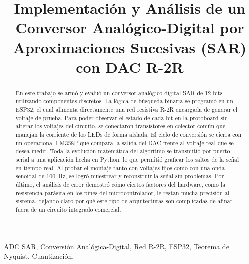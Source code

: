 \documentclass[conference]{IEEEtran}
\begin{document}
\title{Implementación y Análisis de un Conversor Analógico-Digital por Aproximaciones Sucesivas (SAR) con DAC R-2R}

\author{
}

\IEEEaftertitletext{\vspace{-1\baselineskip}}
\maketitle

\renewcommand\abstractname{Resumen}
\begin{abstract}
En este trabajo se armó y evaluó un conversor analógico-digital SAR de 12 bits utilizando componentes discretos. La lógica de búsqueda binaria se programó en un ESP32, el cual alimenta directamente una red resistiva R-2R encargada de generar el voltaje de prueba. Para poder observar el estado de cada bit en la protoboard sin alterar los voltajes del circuito, se conectaron transistores en colector común que manejan la corriente de los LEDs de forma aislada. El ciclo de conversión se cierra con un operacional LM358P que compara la salida del DAC frente al voltaje real que se desea medir. Toda la evolución matemática del algoritmo se transmitió por puerto serial a una aplicación hecha en Python, lo que permitió graficar los saltos de la señal en tiempo real. Al probar el montaje tanto con voltajes fijos como con una onda senoidal de 100~Hz, se logró muestrear y reconstruir la señal sin problemas. Por último, el análisis de error demostró cómo ciertos factores del hardware, como la resistencia parásita en los pines del microcontrolador, le restan mucha precisión al sistema, dejando claro por qué este tipo de arquitecturas son complicadas de afinar fuera de un circuito integrado comercial.
\end{abstract}

\renewcommand\IEEEkeywordsname{Palabras clave}
\begin{IEEEkeywords}
ADC SAR, Conversión Analógica-Digital, Red R-2R, ESP32, Teorema de Nyquist, Cuantización.
\end{IEEEkeywords}
\end{document}
